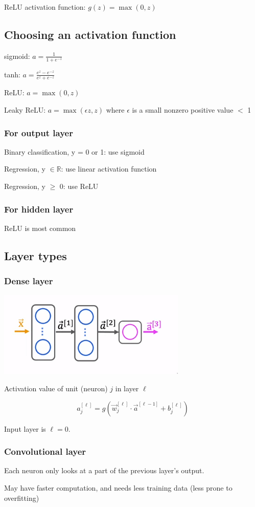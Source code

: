 \documentclass[12pt]{article}
\begin{document}
ReLU activation function: $g(z) = \max(0, z)$

\subsection{Choosing an activation function}

sigmoid: $a = \frac{1}{1 + e^{-z}}$

tanh: $a = \frac{e^z - e^{-z}}{e^z + e^{-z}}$

ReLU: $a = \max(0, z)$

Leaky ReLU: $a = \max(\epsilon z, z)$ where $\epsilon$ is a small nonzero positive value $<$ 1

\subsubsection*{For output layer}

Binary classification, y = 0 or 1: use sigmoid

Regression, y $\in \mathbb{R}$: use linear activation function

Regression, y $\geq$ 0: use ReLU

\subsubsection*{For hidden layer}

ReLU is most common

\subsection{Layer types}

\subsubsection*{Dense layer}

\includegraphics{nn/dense_layer}

Activation value of unit (neuron) $j$ in layer $\ell$

\[ a_j^{[\ell]} = g(\vec{w}_j^{[\ell]} \cdot \vec{a}^{[\ell - 1]} + b_j^{[\ell]}) \]

Input layer is $\ell = 0$.

\subsubsection*{Convolutional layer}

Each neuron only looks at a part of the previous layer's output.

May have faster computation, and needs less training data (less prone to overfitting)
\end{document}
